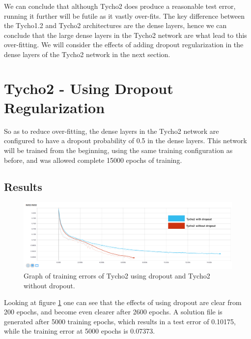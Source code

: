 \documentclass[12pt,a4paper,oneside,oldfontcommands]{memoir}
\begin{document}
\begin{Declaration Of OriginalityOrginality}
We can conclude that although Tycho2 does produce a reasonable test error, running it further will be futile as it vastly over-fits. The key difference between the Tycho1.2 and Tycho2 architectures are the dense layers, hence we can conclude that the large dense layers in the Tycho2 network are what lead to this over-fitting. We will consider the effects of adding dropout regularization in the dense layers of the Tycho2 network in the next section.

\section{Tycho2 - Using Dropout Regularization} \label{tycho2-dropout}

So as to reduce over-fitting, the dense layers in the Tycho2 network are configured to have a dropout probability of 0.5 in the dense layers. This network will be trained from the beginning, using the same training configuration as before, and was allowed complete 15000 epochs of training.

\subsection{Results}

\begin{figure}[H]
  \centering
    \includegraphics[width=\linewidth]{images/tycho2vsdropout.png}
    \caption{Graph of training errors of Tycho2 using dropout and Tycho2 without dropout.}
   \label{fig:tycho-2-dropout-graph}
\end{figure}


Looking at figure \ref{fig:tycho-2-dropout-graph} one can see that the effects of using dropout are clear from 200 epochs, and become even clearer after 2600 epochs. A solution file is generated after 5000 training epochs, which results in a test error of 0.10175, while the training error at 5000 epochs is 0.07373. 


\end{Declaration Of OriginalityOrginality}
\end{document}
